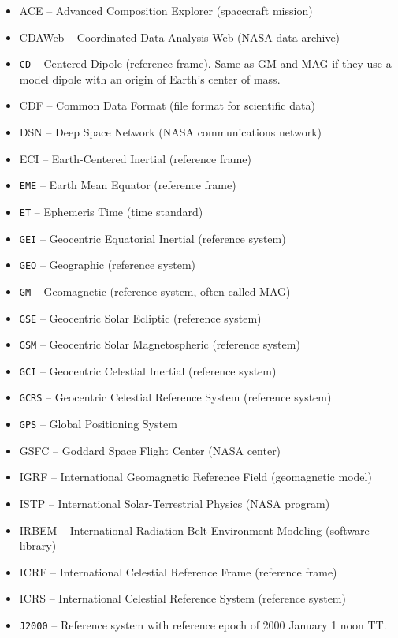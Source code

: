 \documentclass[draft]{agujournal2019}
\begin{document}
\begin{itemize}
\item ACE -- Advanced Composition Explorer (spacecraft mission)
\item CDAWeb -- Coordinated Data Analysis Web (NASA data archive)
\item \texttt{CD} -- Centered Dipole (reference frame). Same as GM and MAG if they use a model dipole with an origin of Earth's center of mass.
\item CDF -- Common Data Format (file format for scientific data)
\item DSN -- Deep Space Network (NASA communications network)
\item ECI -- Earth-Centered Inertial (reference frame)
\item  \texttt{EME} -- Earth Mean Equator (reference frame)
\item  \texttt{ET} -- Ephemeris Time (time standard)
\item  \texttt{GEI} -- Geocentric Equatorial Inertial (reference system)
\item  \texttt{GEO} -- Geographic (reference system)
\item  \texttt{GM} -- Geomagnetic (reference system, often called MAG)
\item  \texttt{GSE} -- Geocentric Solar Ecliptic (reference system)
\item  \texttt{GSM} -- Geocentric Solar Magnetospheric (reference system)
\item  \texttt{GCI} -- Geocentric Celestial Inertial (reference system)
\item  \texttt{GCRS} -- Geocentric Celestial Reference System (reference system)
\item  \texttt{GPS} -- Global Positioning System
\item GSFC -- Goddard Space Flight Center (NASA center)
\item IGRF -- International Geomagnetic Reference Field (geomagnetic model)
\item ISTP -- International Solar-Terrestrial Physics (NASA program)
\item IRBEM -- International Radiation Belt Environment Modeling (software library)
\item ICRF -- International Celestial Reference Frame (reference frame)
\item ICRS -- International Celestial Reference System (reference system)
\item  \texttt{J2000} -- Reference system with reference epoch of 2000 January 1 noon TT.

\end{itemize}
\end{document}
